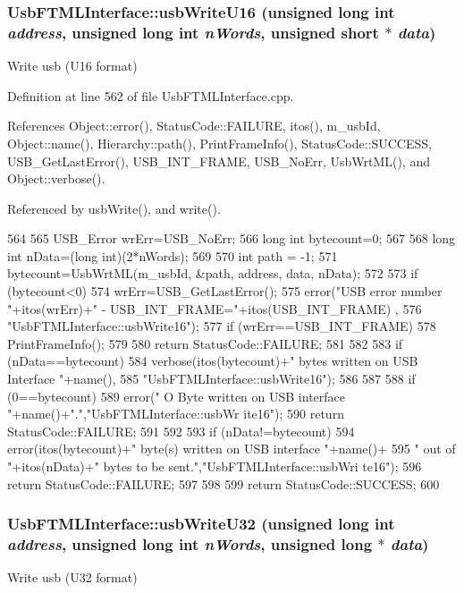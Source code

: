 \hypertarget{classUsbFTMLInterface_ab5c7e059f621774c6f51a1a7e9012aed}{
\subsubsection[{usbWriteU16}]{ UsbFTMLInterface::usbWriteU16 (unsigned long int {\em address}, \/  unsigned long int {\em nWords}, \/  unsigned short $\ast$ {\em data})}}
\label{classUsbFTMLInterface_ab5c7e059f621774c6f51a1a7e9012aed}
Write usb (U16 format) 

Definition at line 562 of file UsbFTMLInterface.cpp.

References Object::error(), StatusCode::FAILURE, itos(), m\_\-usbId, Object::name(), Hierarchy::path(), PrintFrameInfo(), StatusCode::SUCCESS, USB\_\-GetLastError(), USB\_\-INT\_\-FRAME, USB\_\-NoErr, UsbWrtML(), and Object::verbose().

Referenced by usbWrite(), and write().


\begin{DoxyCode}
564                                                                {
565   USB_Error wrErr=USB_NoErr;
566   long int  bytecount=0;
567 
568   long int nData=(long int)(2*nWords);
569 
570   int path = -1;
571   bytecount=UsbWrtML(m_usbId, &path, address, data, nData);
572 
573   if (bytecount<0){
574     wrErr=USB_GetLastError();
575     error("USB error number "+itos(wrErr)+" - USB_INT_FRAME="+itos(USB_INT_FRAME)
      ,
576             "UsbFTMLInterface::usbWrite16");
577     if (wrErr==USB_INT_FRAME){
578       PrintFrameInfo();
579     } 
580     return StatusCode::FAILURE;
581   }
582 
583   if (nData==bytecount){
584     verbose(itos(bytecount)+" bytes written on USB Interface "+name(),
585             "UsbFTMLInterface::usbWrite16");
586   }
587   
588   if (0==bytecount){
589     error(" O Byte written on USB interface "+name()+".","UsbFTMLInterface::usbWr
      ite16");
590     return StatusCode::FAILURE;
591   }
592 
593   if (nData!=bytecount){
594     error(itos(bytecount)+" byte(s) written on USB interface "+name()+
595             " out of "+itos(nData)+" bytes to be sent.","UsbFTMLInterface::usbWri
      te16");
596     return StatusCode::FAILURE;    
597   }
598 
599   return StatusCode::SUCCESS;  
600 }
\end{DoxyCode}
\hypertarget{classUsbFTMLInterface_a79433fc9a3dd8c96519960cd55958fbf}{
\subsubsection[{usbWriteU32}]{ UsbFTMLInterface::usbWriteU32 (unsigned long int {\em address}, \/  unsigned long int {\em nWords}, \/  unsigned long $\ast$ {\em data})}}
\label{classUsbFTMLInterface_a79433fc9a3dd8c96519960cd55958fbf}
Write usb (U32 format) 

